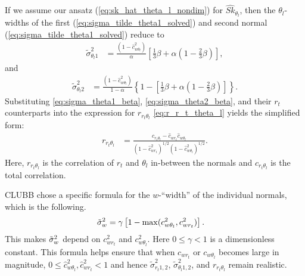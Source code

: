 If we assume our ansatz (\cref{eq:sk_hat_theta_l_nondim}) for $\widehat{Sk}_{\theta_l}$,
then the $\theta_l$-widths of the first (\cref{eq:sigma_tilde_theta1_solved})
and second normal (\cref{eq:sigma_tilde_theta1_solved}) reduce to
\begin{align}
    \label{eq:sigma_theta1_beta}
    \tilde{\sigma}_{\theta_l 1}^2
    &= \frac{\left(1 - \widehat{c}_{w \theta_l}^2\right)}{\alpha} \left[\frac{1}{3} \beta + \alpha \left(1 - \frac{2}{3} \beta\right)\right],
\end{align}
and
\begin{align}
    \label{eq:sigma_theta2_beta}
    \tilde{\sigma}_{\theta_l 2}^2
    &= \frac{\left(1 - \widehat{c}_{w \theta_l}^2\right)} {1 - \alpha} \left\{1 - \left[\frac{1}{3}\beta + \alpha \left(1 - \frac{2}{3} \beta \right)\right]\right\}.
\end{align}
Substituting \cref{eq:sigma_theta1_beta}, \cref{eq:sigma_theta2_beta},
and their $r_t$ counterparts into the expression for $r_{r_t \theta_l}$ \cref{eq:r_r_t_theta_l}
yields the simplified form:
\begin{align}
    \label{eq:r_r_t_theta_l_beta}
    r_{r_t \theta_l}
    &= \frac{c_{r_t \theta_l} - \widehat{c}_{w r_t} \widehat{c}_{w \theta_l}}{\left(1 - \widehat{c}_{w r_t}^2\right)^{1/2} \left(1 - \widehat{c}_{w \theta_l}^2\right)^{1/2}}.
\end{align}
Here, $r_{r_t \theta_l}$ is the correlation of $r_t$ and $\theta_l$ in-between the normals
and $c_{r_t \theta_l}$ is the total correlation.

\gls{CLUBB} chose a specific formula for the $w$-\enquote{width} of the individual normals,
which is the following.
\begin{align}
    \label{eq:sigma_tilde_w_restricted}
    {\tilde{\sigma}_w}^2
    &= \gamma \left[1 - \max(c_{w \theta_l}^2, c_{w r_t}^2) \right].
\end{align}
This makes ${\tilde{\sigma}_w}^2$ depend on $c_{w r_t}^2$ and $c_{w \theta_l}^2$.
Here $0 \leq \gamma < 1$ is a dimensionless constant.
This formula helps ensure that when $c_{w r_t}$ or $c_{w \theta_l}$ becomes large in magnitude,
$0 \leq \widehat{c}_{w \theta_l}^2, \widehat{c}_{w r_t}^2 < 1$
and hence $\tilde{\sigma}_{r_t 1,2}^2$, $\tilde{\sigma}_{\theta_l 1,2}^2$, and $r_{r_t \theta_l}$ remain realistic.